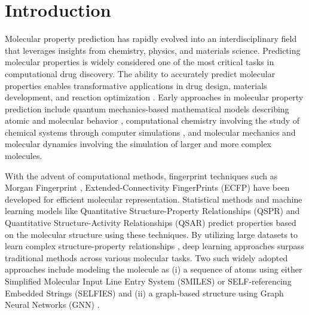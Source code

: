 \documentclass[sigconf,nonacm]{acmart}
\begin{document}










\maketitle

\section{Introduction}





Molecular property prediction  \cite{MPP-dec-19} has rapidly evolved into an interdisciplinary field that leverages insights from chemistry, physics, and materials science. Predicting molecular properties is widely considered one of the most critical tasks in computational drug discovery. The ability to accurately predict molecular properties enables transformative applications in drug design, materials development, and reaction optimization \cite{ doi:10.1021/acscentsci.8b00507,OLIVEIRA2022863, https://doi.org/10.1002/inf2.12094}.
Early approaches in molecular property prediction include quantum mechanics-based mathematical models describing atomic and molecular behavior \cite{Woolley1998IsTA}, computational chemistry involving the study of chemical systems through computer simulations \cite{inproceedings}, and molecular mechanics and molecular dynamics \cite{Mouvet2022} involving the simulation of larger and more complex molecules.








With the advent of computational methods, fingerprint techniques such as Morgan Fingerprint \cite{Morgan1965}, Extended-Connectivity FingerPrints (ECFP) \cite{doi:10.1021/ci100050t} have been developed for efficient molecular representation. Statistical methods and machine learning models like Quantitative Structure-Property Relationships (QSPR) \cite{BLAKE1886} and Quantitative Structure-Activity Relationships (QSAR) \cite{article4} predict properties based on the molecular structure using these techniques. By utilizing large datasets to learn complex structure-property relationships \cite{LeCun2015-fu, Vamathevan2019-pl}, deep learning approaches surpass traditional methods  across various molecular tasks. Two such widely adopted approaches include modeling the molecule as (i) a sequence of atoms using either Simplified Molecular Input Line Entry System (SMILES) \cite{doi:10.1021/ci00057a005} or SELF-referencing Embedded Strings (SELFIES) \cite{Krenn_2022} and (ii) a graph-based structure using Graph Neural Networks (GNN) \cite{4700287}. 
\end{document}
